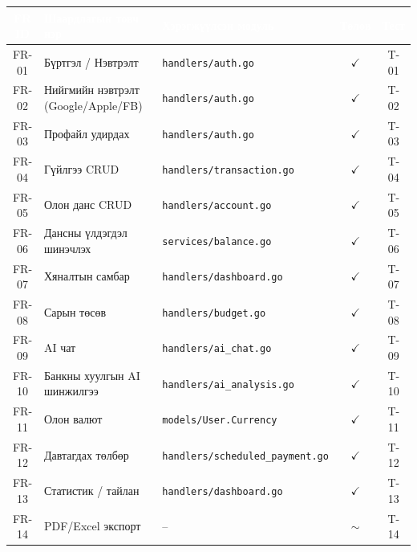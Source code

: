 \begin{table}[ht]
\centering
\scriptsize
\renewcommand{\arraystretch}{1.2}
\begin{tabular}{|c|p{4.5cm}|p{3.8cm}|c|c|}
\hline
\rowcolor{darknavy}
\textcolor{white}{\textbf{FR ID}} &
\textcolor{white}{\textbf{Шаардлагын товч нэр}} &
\textcolor{white}{\textbf{Хэрэгжүүлсэн модуль}} &
\textcolor{white}{\textbf{Төлөв}} &
\textcolor{white}{\textbf{Тест}} \\ \hline
FR-01 & Бүртгэл / Нэвтрэлт              & \texttt{handlers/auth.go}           & $\checkmark$ & T-01 \\ \hline
FR-02 & Нийгмийн нэвтрэлт (Google/Apple/FB)  & \texttt{handlers/auth.go}           & $\checkmark$ & T-02 \\ \hline
FR-03 & Профайл удирдах                 & \texttt{handlers/auth.go}           & $\checkmark$ & T-03 \\ \hline
FR-04 & Гүйлгээ CRUD                    & \texttt{handlers/transaction.go}    & $\checkmark$ & T-04 \\ \hline
FR-05 & Олон данс CRUD                  & \texttt{handlers/account.go}        & $\checkmark$ & T-05 \\ \hline
FR-06 & Дансны үлдэгдэл шинэчлэх        & \texttt{services/balance.go}        & $\checkmark$ & T-06 \\ \hline
FR-07 & Хяналтын самбар                 & \texttt{handlers/dashboard.go}      & $\checkmark$ & T-07 \\ \hline
FR-08 & Сарын төсөв                     & \texttt{handlers/budget.go}         & $\checkmark$ & T-08 \\ \hline
FR-09 & AI чат                          & \texttt{handlers/ai\_chat.go}       & $\checkmark$ & T-09 \\ \hline
FR-10 & Банкны хуулгын AI шинжилгээ     & \texttt{handlers/ai\_analysis.go}   & $\checkmark$ & T-10 \\ \hline
FR-11 & Олон валют                      & \texttt{models/User.Currency}       & $\checkmark$ & T-11 \\ \hline
FR-12 & Давтагдах төлбөр                & \texttt{handlers/scheduled\_payment.go} & $\checkmark$ & T-12 \\ \hline
FR-13 & Статистик / тайлан              & \texttt{handlers/dashboard.go}      & $\checkmark$ & T-13 \\ \hline
FR-14 & PDF/Excel экспорт               & --                                  & $\sim$       & T-14 \\ \hline

\end{tabular}
\end{table}
